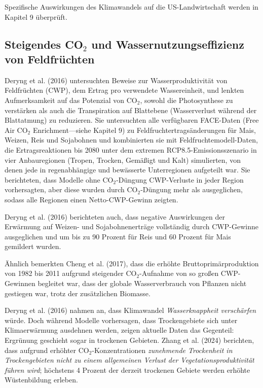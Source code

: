 \documentclass[12pt,paper=a4,DIV=12,parskip=never,chapterprefix=false,headings=standardclasses]{scrreprt}
\numberwithin{figure}{chapter}
\begin{document}
Spezifische Auswirkungen des Klimawandels auf die US-Landwirtschaft werden in Kapitel 9 überprüft.

\subsection{Steigendes CO$_2$ und Wassernutzungseffizienz von Feldfrüchten}

Deryng et al. (2016) untersuchten Beweise zur Wasserproduktivität von Feldfrüchten (CWP), dem Ertrag pro verwendete Wassereinheit, und lenkten Aufmerksamkeit auf das Potenzial von CO$_2$, sowohl die Photosynthese zu verstärken als auch die Transpiration auf Blattebene (Wasserverlust während der Blattatmung) zu reduzieren. Sie untersuchten alle verfügbaren FACE-Daten (Free Air CO$_2$ Enrichment—siehe Kapitel 9) zu Feldfruchtertragsänderungen für Mais, Weizen, Reis und Sojabohnen und kombinierten sie mit Feldfruchtemodell-Daten, die Ertragsreaktionen bis 2080 unter dem extremen RCP8.5-Emissionsszenario in vier Anbauregionen (Tropen, Trocken, Gemäßigt und Kalt) simulierten, von denen jede in regenabhängige und bewässerte Unterregionen aufgeteilt war. Sie berichteten, dass Modelle ohne CO$_2$-Düngung CWP-Verluste in jeder Region vorhersagten, aber diese wurden durch CO$_2$-Düngung mehr als ausgeglichen, sodass alle Regionen einen Netto-CWP-Gewinn zeigten.

Deryng et al. (2016) berichteten auch, dass negative Auswirkungen der Erwärmung auf Weizen- und Sojabohnenerträge vollständig durch CWP-Gewinne ausgeglichen und um bis zu 90 Prozent für Reis und 60 Prozent für Mais gemildert wurden.

Ähnlich bemerkten Cheng et al. (2017), dass die erhöhte Bruttoprimärproduktion von 1982 bis 2011 aufgrund steigender CO$_2$-Aufnahme von so großen CWP-Gewinnen begleitet war, dass der globale Wasserverbrauch von Pflanzen nicht gestiegen war, trotz der zusätzlichen Biomasse.

Deryng et al. (2016) nahmen an, dass Klimawandel \emph{Wasserknappheit verschärfen} würde. Doch während Modelle vorhersagen, dass Trockengebiete sich unter Klimaerwärmung ausdehnen werden, zeigen aktuelle Daten das Gegenteil: Ergrünung geschieht sogar in trockenen Gebieten. Zhang et al. (2024) berichten, dass aufgrund erhöhter CO$_2$-Konzentrationen \emph{zunehmende Trockenheit in Trockengebieten nicht zu einem allgemeinen Verlust der Vegetationsproduktivität führen wird}; höchstens 4 Prozent der derzeit trockenen Gebiete werden erhöhte Wüstenbildung erleben.
\end{document}

